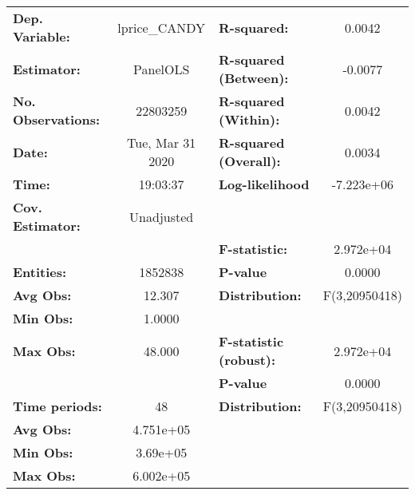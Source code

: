 \documentclass{report}
\begin{document}
\begin{center}
\begin{tabular}{lclc}
\toprule
\textbf{Dep. Variable:}       &   lprice\_CANDY    & \textbf{  R-squared:         }   &      0.0042      \\
\textbf{Estimator:}           &      PanelOLS      & \textbf{  R-squared (Between):}  &     -0.0077      \\
\textbf{No. Observations:}    &      22803259      & \textbf{  R-squared (Within):}   &      0.0042      \\
\textbf{Date:}                &  Tue, Mar 31 2020  & \textbf{  R-squared (Overall):}  &      0.0034      \\
\textbf{Time:}                &      19:03:37      & \textbf{  Log-likelihood     }   &    -7.223e+06    \\
\textbf{Cov. Estimator:}      &     Unadjusted     & \textbf{                     }   &                  \\
\textbf{}                     &                    & \textbf{  F-statistic:       }   &    2.972e+04     \\
\textbf{Entities:}            &      1852838       & \textbf{  P-value            }   &      0.0000      \\
\textbf{Avg Obs:}             &       12.307       & \textbf{  Distribution:      }   &  F(3,20950418)   \\
\textbf{Min Obs:}             &       1.0000       & \textbf{                     }   &                  \\
\textbf{Max Obs:}             &       48.000       & \textbf{  F-statistic (robust):} &    2.972e+04     \\
\textbf{}                     &                    & \textbf{  P-value            }   &      0.0000      \\
\textbf{Time periods:}        &         48         & \textbf{  Distribution:      }   &  F(3,20950418)   \\
\textbf{Avg Obs:}             &     4.751e+05      & \textbf{                     }   &                  \\
\textbf{Min Obs:}             &      3.69e+05      & \textbf{                     }   &                  \\
\textbf{Max Obs:}             &     6.002e+05      & \textbf{                     }   &                  \\
\bottomrule
\end{tabular}
\begin{tabular}{lcccccc}

\end{tabular}
\end{center}
\end{document}
